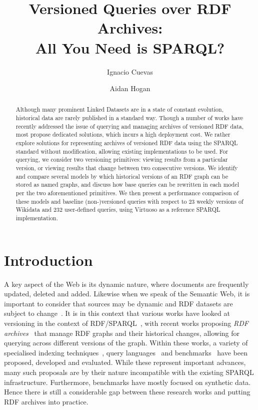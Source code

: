 \documentclass{llncs}
\begin{document}
\title{Versioned Queries over RDF Archives:\\All You Need is SPARQL?}

\author{Ignacio Cuevas \and Aidan Hogan}

\maketitle

\begin{abstract}
Although many prominent Linked Datasets are in a state of constant evolution, historical data are rarely published in a standard way. Though a number of works have recently addressed the issue of querying and managing archives of versioned RDF data, most propose dedicated solutions, which incurs a high deployment cost. We rather explore solutions for representing archives of versioned RDF data using the SPARQL standard without modification, allowing existing implementations to be used. For querying, we consider two versioning primitives: viewing results from a particular version, or viewing results that change between two consecutive versions. We identify and compare several models by which historical versions of an RDF graph can be stored as named graphs, and discuss how base queries can be rewritten in each model per the two aforementioned primitives. We then present a performance comparison of these models and baseline (non-)versioned queries with respect to 23 weekly versions of Wikidata and 232 user-defined queries, using Virtuoso as a reference SPARQL implementation.
\end{abstract}


\section{Introduction}

A key aspect of the Web is its dynamic nature, where documents are frequently updated, deleted and added. Likewise when we speak of the Semantic Web, it is important to consider that sources may be dynamic and RDF datasets are subject to change~\cite{KaferAUOH13}. It is in this context that various works have looked at versioning in the context of RDF/SPARQL~\cite{VolkelG06,TappoletB09,Grandi10,GraubeHU14,KhuranaD16}, with recent works proposing \textit{RDF archives}~\cite{FernandezPU15,Cerdeira-PenaFF16,BahriLA18,FernandezUPK19,TaelmanSHMV19} that manage RDF graphs and their historical changes, allowing for querying across different versions of the graph. Within these works, a variety of specialised indexing techniques~\cite{Cerdeira-PenaFF16,BahriLA18,TaelmanSHMV19}, query languages~\cite{TappoletB09} and benchmarks~\cite{KotsevMPEFK16,FernandezUPK19} have been proposed, developed and evaluated. While these represent important advances, many such proposals are by their nature incompatible with the existing SPARQL infrastructure. Furthermore, benchmarks have mostly focused on synthetic data. Hence there is still a considerable gap between these research works and putting RDF archives into practice.
\end{document}
